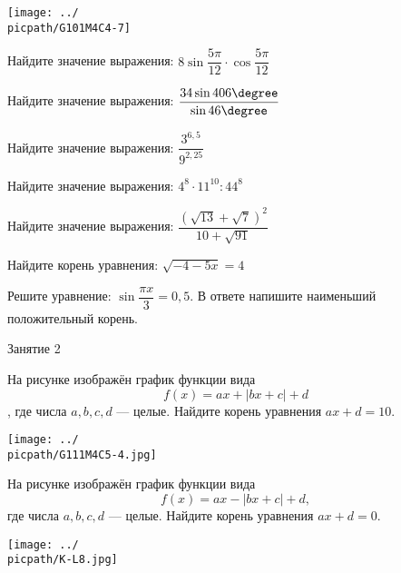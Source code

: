 \begin{homework}[number=1]
\begin{listofex}
\begin{minipage}[t]{\bodywidth}
		\end{minipage}
		\hspace{0.02\linewidth}
		\begin{minipage}[t]{\picwidth}
			\texttt{[image: ../\\picpath/G101M4C4-7]}
		\end{minipage}
		\item Найдите значение выражения: \( 8\sin{\dfrac{5\pi}{12}}\cdot\cos{\dfrac{5\pi}{12}} \)
		\item Найдите значение выражения: \( \dfrac{34\sin{406\degree}}{\sin{46\degree}} \)
		\item Найдите значение выражения: \( \dfrac{3^{6,5}}{9^{2,25}} \)
		\item Найдите значение выражения: \( 4^8 \cdot 11^{10} : 44^8 \)
		\item Найдите значение выражения: \( \dfrac{(\sqrt{13}+\sqrt{7})^2}{10+\sqrt{91}} \)
		\item Найдите корень уравнения: \( \sqrt{-4-5x}=4 \)
		\item Решите уравнение: \( \sin{\dfrac{\pi x}{3}}=0,5 \). В ответе напишите наименьший положительный корень.
	\end{listofex}
\end{homework}

\begin{class}[number=2]
	\begin{listofex}
		\item Занятие 2
	\end{listofex}
\end{class}

\begin{homework}[number=2]
	\begin{listofex}
		\item
		\begin{minipage}[t]{0.7\linewidth}
			На рисунке изображён график функции вида \[f(x)=ax+|bx+c|+d\], где числа \(a, b, c, d\) --- целые. Найдите корень уравнения \(ax+d=10\).
		\end{minipage}
		\begin{minipage}[t]{0.25\linewidth}
			\texttt{[image: ../\\picpath/G111M4C5-4.jpg]}
		\end{minipage}
		\item
		\begin{minipage}[t]{\bodywidth}
			На рисунке изображён график функции вида \[ f(x)=ax-|bx+c|+d, \] где числа \(a, b, c, d\) --- целые. Найдите корень уравнения \(ax+d=0\).
		\end{minipage}
		\hspace{0.02\linewidth}
		\begin{minipage}[t]{\picwidth}
			\texttt{[image: ../\\picpath/K-L8.jpg]}
		\end{minipage}
	\end{listofex}
\end{homework}

